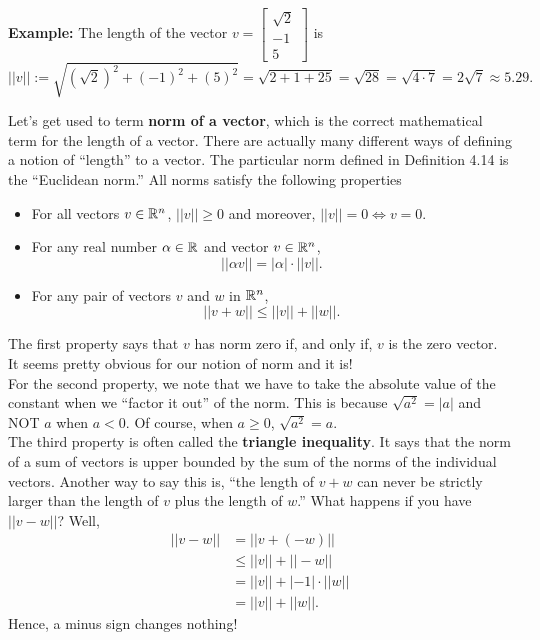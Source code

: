 \vspace*{0.2cm}

\textbf{Example:} The length of the vector $v=  \left[ \begin{array}{r} \sqrt{2} \\ -1 \\ 5   \end{array} \right] $ is
$$ ||v||:=\sqrt{ (\sqrt{2})^2 + (-1)^2 + (5)^2 } = \sqrt{ 2 +1 + 25 } =\sqrt{28} = \sqrt{ 4 \cdot 7} = 2 \sqrt{7} \approx 5.29. $$


\vspace*{0.5cm}
\begin{tcolorbox}[sharp corners, colback=green!30, colframe=green!80!blue, title=\textbf{\large Properties of the Norm of a vector}]
Let's get used to term \textbf{norm of a vector}, which is the correct mathematical term for the length of a vector. There are actually many different ways of defining a notion of ``length'' to a vector. The particular norm defined in Definition 4.14 is the ``Euclidean norm.'' All norms satisfy the following properties 
\begin{itemize}
    \item For all vectors $v \in \mathbb R^n$, $||v|| \ge 0$ and moreover, $||v||=0 \iff v=0$. 
    \item For any real number $\alpha \in \mathbb R$ and vector $v \in \mathbb R^n$, $$||\alpha v|| = |\alpha| \cdot ||v||.$$
    \item For any pair of vectors $v$ and $w$ in $\mathbb R^n$,
$$ ||v + w|| \le ||v|| + ||w||. $$
\end{itemize}

\vspace*{0.5cm}
The first property says that $v$ has norm zero if, and only if, $v$ is the zero vector. It seems pretty obvious for our notion of norm and it is!\\


For the second property, we note that we have to take the absolute value of the constant when we ``factor it out'' of the norm. This is because $\sqrt{a^2} = |a|$ and NOT $a$ when $a < 0$. Of course, when $a \ge 0$, $\sqrt{a^2} = a$.\\

The third property is often called the \textbf{triangle inequality}. It says that the norm of a sum of vectors is upper bounded by the sum of the norms of the individual vectors. Another way to say this is, ``the length of $v + w$ can never be strictly larger than the length of $v$ plus the length of $w$.'' What happens if you have $||v-w||$? Well,
\begin{equation}    
\label{eq:TriagIneqJWG}
\begin{aligned}
    ||v-w|| & = ||v + (-w)|| \\
    & \le ||v|| + ||-w|| \\
    & = ||v|| + |-1|\cdot ||w|| \\
    & = ||v|| + ||w||.
\end{aligned}
\end{equation}
Hence, a minus sign changes nothing!

\end{tcolorbox}


